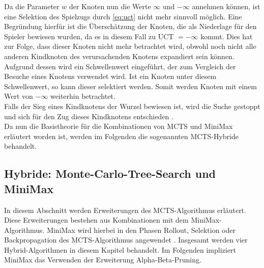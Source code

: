 \documentclass[12pt,a4paper,bibliography=totocnumbered,listof=totocnumbered]{article}
\begin{document}
Da die Parameter $w$ der Knoten nun die Werte $\infty$ und $-\infty$ annehmen können, ist eine Selektion des Spielzugs durch \autoref{eq:uct} nicht mehr sinnvoll möglich. Eine Begründung hierfür ist die Überschätzung der Knoten, die als Niederlage für den Spieler bewiesen wurden, da es in diesem Fall zu UCT $= -\infty$ kommt. Dies hat zur Folge, dass dieser Knoten nicht mehr betrachtet wird, obwohl noch nicht alle anderen Kindknoten des verursachenden Knotens expandiert sein können. Aufgrund dessen wird ein Schwellenwert eingeführt, der zum Vergleich der Besuche eines Knotens verwendet wird. Ist ein Knoten unter diesem Schwellenwert, so kann dieser selektiert werden. Somit werden Knoten mit einem Wert von  $-\infty$ weiterhin betrachtet.\\
Falls der Sieg eines Kindknotens der Wurzel bewiesen ist, wird die Suche gestoppt und sich für den Zug dieses Kindknotens entschieden \citep{Winands.2008}.\\
Da nun die Basistheorie für die Kombinationen von MCTS und MiniMax erläutert worden ist, werden im Folgenden die sogenannten MCTS-Hybride behandelt.

\subsection{Hybride: Monte-Carlo-Tree-Search und MiniMax} \label{sec:mcts-hyb}
In diesem Abschnitt werden Erweiterungen des MCTS-Algorithmus erläutert. Diese Erweiterungen bestehen aus Kombinationen mit dem MiniMax-Algorithmus. MiniMax wird hierbei in den Phasen Rollout, Selektion oder Backpropagation des MCTS-Algorithmus angewendet \citep{Baier.2015}. Insgesamt werden vier Hybrid-Algorithmen in diesem Kapitel behandelt. Im Folgenden impliziert MiniMax das Verwenden der Erweiterung Alpha-Beta-Pruning.
\end{document}
